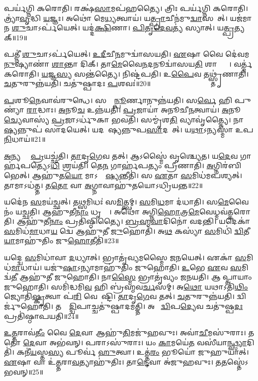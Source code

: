 𑌪𑌰𑍍𑌯॑𑌗𑍍𑌨𑌿 𑌕𑌰𑍋𑌤𑌿।
𑌰𑌕𑍍𑌷॑\ul{𑌸𑌾}𑌮𑌪॑𑌹𑌤𑍍𑌯𑍈।
𑌤𑍍𑌰𑌿𑌃 𑌪𑌰𑍍𑌯॑𑌗𑍍𑌨𑌿 𑌕𑌰𑍋𑌤𑌿।
𑌤𑍍𑌰𑍍𑌯𑌾॑\ul{𑌵𑍃}𑌦𑍍𑌧𑌿 \ul{𑌯}𑌜𑍍𑌞𑌃।
𑌅𑌥𑍋॑ 𑌮𑍇\ul{𑌧𑍍𑌯}𑌤𑍍𑌵𑌾𑌯॑।
𑌯\ul{𑌤𑍍𑌪𑍍𑌰𑌾}𑌚𑍀𑌨॑𑌮𑍁\ul{𑌦𑍍𑌵𑌾}𑌸𑌯𑍇᳚𑌤𑍍।
𑌯𑌜॑𑌮𑌾𑌨 \ul{𑌶𑍁}𑌚𑌾\-𑌽𑌰𑍍𑌪॑𑌯𑍇𑌤𑍍।
𑌯𑌦𑍍𑌦॑\ul{𑌕𑍍𑌷𑌿}𑌣𑌾।
\ul{𑌪𑌿}\ul{𑌤𑍃}\ul{𑌦𑍇}\ul{𑌵}𑌤𑍍𑌯॑ 𑌸𑍍𑌯𑌾𑌤𑍍।
𑌯\ul{𑌤𑍍𑌪𑍍𑌰}𑌤𑍍𑌯𑌕𑍍॥19॥

𑌪𑌤𑍍𑌨𑍀॑ \ul{𑌶𑍁}𑌚𑌾\-𑌽𑌰𑍍𑌪॑𑌯𑍇𑌤𑍍।
\ul{𑌉}\ul{𑌦𑍀}𑌚𑍀\ul{𑌨}𑌮𑍁𑌦𑍍𑌵𑌾॑𑌸𑌯𑌤𑌿।
\ul{𑌏}𑌷𑌾 𑌵𑍈 𑌦𑍇॑𑌵𑌮\ul{𑌨𑍁}𑌷𑍍𑌯𑌾𑌣𑌾॑ \ul{𑌶𑌾}𑌨𑍍𑌤𑌾 𑌦𑌿𑌕𑍍।
𑌤𑌾\ul{𑌮𑍇}𑌵𑍈\ul{𑌨}𑌦𑌨𑍂𑌦𑍍𑌵𑌾॑𑌸𑌯\ul{𑌤𑌿} 𑌶𑌾𑌨𑍍𑌤𑍍𑌯𑍈᳚।
𑌵𑌰𑍍𑌤𑍍𑌮॑ 𑌕𑌰𑍋𑌤𑌿।
\ul{𑌯}𑌜𑍍𑌞\ul{𑌸𑍍𑌯} 𑌸𑌨𑍍𑌤॑𑌤𑍍𑌯𑍈।
𑌨𑌿𑌷𑍍𑌟॑𑌪𑌤𑌿।
𑌉\ul{𑌪𑍈}𑌵 𑌤𑌥𑍍𑌸𑍍𑌤𑍃॑𑌣𑌾𑌤𑌿।
\ul{𑌚}𑌤𑍁𑌰𑍁𑌨𑍍𑌨॑𑌯𑌤𑌿।
𑌚𑌤𑍁॑𑌷𑍍𑌪𑌾𑌦𑌃 \ul{𑌪}𑌶𑌵𑌃॑॥20॥

\ul{𑌪}𑌶𑍂\ul{𑌨𑍇}𑌵𑌾𑌵॑𑌰𑍁𑌨𑍍𑌧𑍇।
𑌸𑌰𑍍𑌵𑌾᳚\ul{𑌨𑍍𑌪𑍂}𑌰𑍍𑌣𑌾𑌨𑍁𑌨𑍍𑌨॑𑌯𑌤𑌿।
𑌸\ul{𑌰𑍍𑌵𑍇} 𑌹𑌿 𑌪𑍁𑌣𑍍𑌯𑌾॑ \ul{𑌰𑌾}𑌦𑍍𑌧𑌾𑌃।
\ul{𑌅}𑌨𑍂\ul{𑌚} 𑌉𑌨𑍍𑌨॑𑌯𑌤𑌿।
\ul{𑌪𑍍𑌰}𑌜𑌾𑌯𑌾॑ 𑌅𑌨𑍂𑌚𑍀\ul{𑌨}𑌤𑍍𑌵𑌾𑌯॑।
\ul{𑌅}𑌨𑍂\ul{𑌚𑍍𑌯𑍇}𑌵𑌾𑌸𑍍𑌯॑ \ul{𑌪𑍍𑌰}𑌜𑌾\-𑌽𑌰𑍍𑌧𑍁॑𑌕𑌾 𑌭𑌵𑌤𑌿।
𑌸𑌮𑍍𑌮𑍃॑𑌶\ul{𑌤𑌿} 𑌵𑍍𑌯𑌾𑌵𑍃॑𑌤𑍍𑌤𑍍𑌯𑍈।
𑌨𑌾𑌹𑍋᳚\ul{𑌷𑍍𑌯}𑌨𑍍𑌨𑍁𑌪॑ 𑌸𑌾𑌦𑌯𑍇𑌤𑍍।
𑌯𑌦𑌹𑍋᳚𑌷𑍍𑌯𑌨𑍍𑌨𑍁𑌪\ul{𑌸𑌾}𑌦𑌯𑍇᳚𑌤𑍍।
𑌯\ul{𑌥𑌾}𑌽𑌨𑍍𑌯𑌸𑍍𑌮𑌾॑ 𑌉𑌪\ul{𑌨𑌿}𑌧𑌾𑌯॑॥21॥

\ul{𑌅}𑌨𑍍𑌯𑌸𑍍𑌮𑍈᳚ \ul{𑌪𑍍𑌰}𑌯𑌚𑍍𑌛॑𑌤𑌿।
\ul{𑌤𑌾}𑌦𑍃\ul{𑌗𑍇}𑌵 𑌤𑌤𑍍।
𑌆𑌽𑌸𑍍𑌮𑍈॑ 𑌵𑍃𑌶𑍍𑌚𑍍𑌯𑍇𑌤।
𑌯\ul{𑌦𑍇}𑌵 𑌗𑌾𑌰𑍍\mbox{}𑌹॑𑌪𑌤𑍍𑌯𑍇𑌽\ul{𑌧𑌿} 𑌶𑍍𑌰𑌯॑𑌤𑌿।
𑌤𑍇\ul{𑌨} 𑌗𑌾𑌰𑍍\mbox{}𑌹॑𑌪𑌤𑍍𑌯𑌂 𑌪𑍍𑌰𑍀𑌣𑌾𑌤𑌿।
\ul{𑌅}𑌗𑍍𑌨𑌿𑌰॑𑌬𑌿𑌭𑍇𑌤𑍍।
𑌆𑌹𑍁॑𑌤\ul{𑌯𑍋} 𑌮𑌾𑌽𑌤𑍍𑌯𑍇᳚\ul{𑌷𑍍𑌯}𑌨𑍍𑌤𑍀𑌤𑌿॑।
𑌸 \ul{𑌏}𑌤𑌾 \ul{𑌸}𑌮𑌿𑌧॑𑌮𑌪𑌶𑍍𑌯𑌤𑍍।
𑌤𑌾𑌮𑌾𑌽𑌧॑𑌤𑍍𑌤।
𑌤\ul{𑌤𑍋} 𑌵𑌾 \ul{𑌅}𑌗𑍍𑌨𑌾𑌵𑌾𑌹𑍁॑𑌤𑌯𑍋\-𑌽𑌧𑍍𑌰𑌿𑌯𑌨𑍍𑌤॥22॥

𑌯𑌦𑍇॑𑌨 \ul{𑌸}𑌮𑌯॑𑌚𑍍𑌛𑌤𑍍।
𑌤\ul{𑌥𑍍𑌸}𑌮𑌿𑌧𑌃॑ 𑌸\ul{𑌮𑌿}𑌤𑍍𑌤𑍍𑌵𑌮𑍍।
\ul{𑌸}𑌮𑌿\ul{𑌧}𑌮𑌾 𑌦॑𑌧𑌾𑌤𑌿।
𑌸\ul{𑌮𑍇}𑌵𑍈𑌨𑌂॑ 𑌯𑌚𑍍𑌛𑌤𑌿।
𑌆𑌹𑍁॑𑌤𑍀\ul{𑌨𑌾𑌂} 𑌧𑍃𑌤𑍍𑌯𑍈᳚।
𑌅𑌥𑍋॑ 𑌅𑌗𑍍𑌨𑌿\ul{𑌹𑍋}𑌤𑍍𑌰\ul{𑌮𑍇}𑌵𑍇𑌧𑍍𑌮𑌵॑𑌤𑍍𑌕𑌰𑍋𑌤𑌿।
𑌆𑌹𑍁॑𑌤𑍀\ul{𑌨𑌾𑌂} 𑌪𑍍𑌰𑌤𑌿॑\-𑌷𑍍𑌠𑌿𑌤𑍍𑌯𑍈।
\ul{𑌬𑍍𑌰}\ul{𑌹𑍍𑌮}\ul{𑌵𑌾}𑌦𑌿𑌨𑍋॑ 𑌵𑌦𑌨𑍍𑌤𑌿।
𑌯𑌦𑍇𑌕𑌾॑ \ul{𑌸}𑌮𑌿𑌧॑\ul{𑌮𑌾}𑌧𑌾\ul{𑌯} 𑌦𑍍𑌵𑍇 𑌆𑌹𑍁॑𑌤𑍀 \ul{𑌜𑍁}𑌹𑍋𑌤𑌿॑।
𑌅\ul{𑌥} 𑌕𑌸𑍍𑌯𑌾॑ \ul{𑌸}𑌮𑌿𑌧𑌿॑ \ul{𑌦𑍍𑌵𑌿}𑌤𑍀\ul{𑌯𑌾}𑌮𑌾𑌹𑍁॑𑌤𑌿𑌂 𑌜𑍁\ul{𑌹𑍋}𑌤𑍀𑌤𑌿॑॥23॥

𑌯𑌦𑍍𑌦𑍍𑌵𑍇 \ul{𑌸}𑌮𑌿𑌧𑌾॑𑌵𑌾 \ul{𑌦}𑌧𑍍𑌯𑌾𑌤𑍍।
𑌭𑍍𑌰𑌾𑌤𑍃॑𑌵𑍍𑌯𑌮𑌸𑍍𑌮𑍈 𑌜𑌨𑌯𑍇𑌤𑍍।
𑌏𑌕𑌾॑ \ul{𑌸}𑌮𑌿𑌧॑\ul{𑌮𑌾}𑌧𑌾𑌯॑।
𑌯𑌜𑍁॑\ul{𑌷𑌾}\-𑌽𑌨𑍍𑌯𑌾𑌮𑌾𑌹𑍁॑𑌤𑌿𑌂 𑌜𑍁𑌹𑍋𑌤𑌿।
\ul{𑌉}𑌭𑍇 \ul{𑌏}𑌵 \ul{𑌸}𑌮𑌿𑌦𑍍𑌵॑\ul{𑌤𑍀} 𑌆𑌹𑍁॑𑌤𑍀 𑌜𑍁𑌹𑍋𑌤𑌿।
𑌨𑌾\ul{𑌸𑍍𑌮𑍈} 𑌭𑍍𑌰𑌾𑌤𑍃॑𑌵𑍍𑌯𑌂 𑌜𑌨𑌯𑌤𑌿।
𑌆𑌦𑍀᳚𑌪𑍍𑌤𑌾𑌯𑌾𑌂 𑌜𑍁𑌹𑍋𑌤𑌿।
𑌸𑌮𑌿॑𑌦𑍍𑌧𑌮𑌿\ul{𑌵} 𑌹𑌿 𑌬𑍍𑌰॑𑌹𑍍𑌮𑌵\ul{𑌰𑍍𑌚}𑌸𑌮𑍍।
𑌅\ul{𑌥𑍋} 𑌯𑌥𑌾\-𑌽𑌤𑌿॑\ul{𑌥𑌿𑌂} 𑌜𑍍𑌯𑍋𑌤𑌿॑\ul{𑌷𑍍𑌕𑍃}𑌤𑍍𑌵𑌾 𑌪॑\ul{𑌰𑌿} 𑌵𑍇𑌵𑍇᳚𑌷𑍍𑌟𑌿।
\ul{𑌤𑌾}𑌦𑍃\ul{𑌗𑍇}𑌵 𑌤𑌤𑍍।
\ul{𑌚}𑌤𑍁𑌰𑍁𑌨𑍍𑌨॑𑌯𑌤𑌿।
𑌦𑍍𑌵𑌿𑌰𑍍𑌜𑍁॑𑌹𑍋𑌤𑌿।
𑌤𑌸𑍍𑌮𑌾᳚\ul{𑌦𑍍𑌦𑍍𑌵𑌿}𑌪𑌾𑌚𑍍𑌚𑌤𑍁॑𑌷𑍍𑌪𑌾𑌦𑌮𑌤𑍍𑌤𑌿।
𑌅𑌥𑍋᳚ \ul{𑌦𑍍𑌵𑌿}𑌪\ul{𑌦𑍍𑌯𑍇}𑌵 𑌚𑌤𑍁॑𑌷𑍍𑌪\ul{𑌦𑌃} 𑌪𑍍𑌰𑌤𑌿॑\-𑌷𑍍𑌠𑌾𑌪𑌯𑌤𑌿॥24॥\anuvakamend[\ul{𑌭}\ul{𑌵}\ul{𑌤𑌿} \ul{𑌪𑍍𑌰}\ul{𑌤𑌿}\ul{𑌷𑌿}𑌞𑍍𑌚𑌤𑌿॑ 𑌗𑌮𑌯𑌤𑌿 \ul{𑌪𑍍𑌰}𑌤𑍍𑌯\ul{𑌕𑍍𑌪}𑌶𑌵॑ 𑌉𑌪\ul{𑌨𑌿}𑌧𑌾𑌯𑌾᳚𑌧𑍍𑌰𑌿\ul{𑌯}𑌨𑍍𑌤𑍇\ul{𑌤𑌿} 𑌤\ul{𑌚𑍍𑌚}𑌤𑍍𑌵𑌾𑌰𑌿॑ 𑌚]

\ul{𑌉}\ul{𑌤𑍍𑌤}𑌰𑌾𑌵॑\ul{𑌤𑍀𑌂} 𑌵𑍈 \ul{𑌦𑍇}𑌵𑌾 𑌆𑌹𑍁॑\ul{𑌤𑌿}𑌮𑌜𑍁॑𑌹𑌵𑍁𑌃।
𑌅𑌵𑌾॑\ul{𑌚𑍀}𑌮𑌸𑍁॑𑌰𑌾𑌃।
𑌤𑌤𑍋॑ \ul{𑌦𑍇}𑌵𑌾 𑌅𑌭॑𑌵𑌨𑍍।
𑌪𑌰𑌾𑌽𑌸𑍁॑𑌰𑌾𑌃।
𑌯𑌂 \ul{𑌕𑌾}𑌮𑌯𑍇॑\ul{𑌤} 𑌵𑌸𑍀॑𑌯𑌾\ul{𑌨𑍍𑌥𑍍𑌸𑍍𑌯𑌾}𑌦𑌿𑌤𑌿॑।
𑌕𑌨𑍀॑\ul{𑌯}𑌸𑍍𑌤\ul{𑌸𑍍𑌯} 𑌪𑍂𑌰𑍍𑌵॑ \ul{𑌹𑍁}𑌤𑍍𑌵𑌾।
𑌉𑌤𑍍𑌤॑\ul{𑌰𑌂} 𑌭𑍂𑌯𑍋॑ 𑌜𑍁𑌹𑍁𑌯𑌾𑌤𑍍।
\ul{𑌏}𑌷𑌾 𑌵𑌾 𑌉॑\ul{𑌤𑍍𑌤}𑌰𑌾\ul{𑌵}𑌤𑍍𑌯𑌾𑌹𑍁॑𑌤𑌿𑌃।
𑌤𑌾\ul{𑌨𑍍𑌦𑍇}𑌵𑌾 𑌅॑𑌜𑍁𑌹𑌵𑍁𑌃।
𑌤\ul{𑌤}𑌸𑍍𑌤𑍇॑\-𑌽𑌭𑌵𑌨𑍍॥25॥

